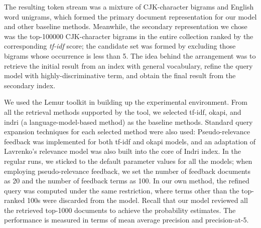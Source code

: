 The resulting token stream was a mixture of CJK-character bigrams and English
word unigrams, which formed the primary document representation for our model
and other baseline methods.  Meanwhile, the secondary representation we chose
was the top-100000 CJK-character bigrams in the entire collection ranked by the
corresponding \emph{tf-idf} score; the candidate set was formed by excluding
those bigrams whose occurrence is less than 5.  The idea behind the arrangement
was to retrieve the initial result from an index with general vocabulary,
refine the query model with highly-discriminative term, and obtain the final
result from the secondary index.

We used the Lemur toolkit in building up the experimental environment.  From
all the retrieval methods supported by the tool, we selected tf-idf, okapi, and
indri (a language-model-based method) as the baseline methods.  Standard query
expansion techniques for each selected method were also used: Pseudo-relevance
feedback was implemented for both tf-idf and okapi models, and an adaptation of
Lavrenko's relevance model was also built into the core of Indri index.  In the
regular runs, we sticked to the default parameter values for all the models;
when employing pseudo-relevance feedback, we set the number of feedback
documents as 20 and the number of feedback terms as 100.  In our own method,
the refined query was computed under the same restriction, where terms other
than the top-ranked 100s were discarded from the model.  Recall that our model
reviewed all the retrieved top-1000 documents to achieve the probability
estimates.  The performance is measured in terms of mean average precision and
precision-at-5.  

